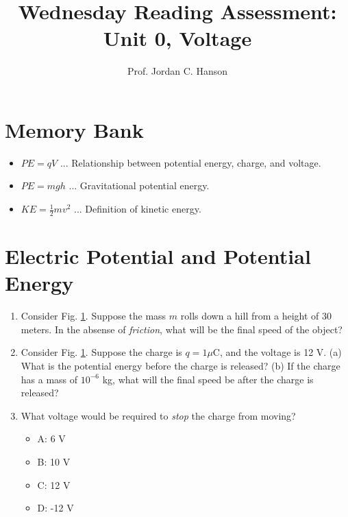 \documentclass{article}
\begin{document}
\title{Wednesday Reading Assessment: Unit 0, Voltage}
\author{Prof. Jordan C. Hanson}

\maketitle

\section{Memory Bank}

\begin{itemize}
\item $PE = q V$ ... Relationship between potential energy, charge, and voltage.
\item $PE = m g h$ ... Gravitational potential energy.
\item $KE = \frac{1}{2}m v^2$ ... Definition of kinetic energy.
\end{itemize}

\section{Electric Potential and Potential Energy}

\begin{enumerate}
\begin{figure}[ht]
\centering
\texttt{[image: hill.png]}
\caption{\label{fig:hill} The relationship between potential energy and voltage.}
\end{figure}
\item Consider Fig. \ref{fig:hill}.  Suppose the mass $m$ rolls down a hill from a height of 30 meters.  In the absense of \textit{friction}, what will be the final speed of the object? \\ \vspace{1cm}
\item Consider Fig. \ref{fig:hill}.  Suppose the charge is $q = 1 \mu$C, and the voltage is 12 V.  (a) What is the potential energy before the charge is released? (b) If the charge has a mass of $10^{-6}$ kg, what will the final speed be after the charge is released? \\ \vspace{1.5cm}
\item What voltage would be required to \textit{stop} the charge from moving?
\begin{itemize}
\item A: 6 V
\item B: 10 V
\item C: 12 V
\item D: -12 V
\end{itemize}
\end{enumerate}
\end{document}
